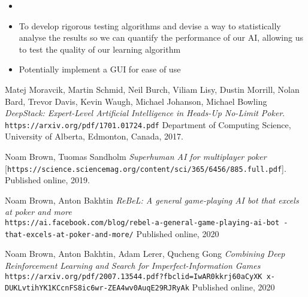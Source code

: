 \documentclass{article}
\begin{document}
\begin{multicols*}{2}
\begin{itemize}
    \item

    \item To develop rigorous testing algorithms and devise a way to statistically analyse the results so we can quantify the performance of our AI, allowing us to test the quality of our learning algorithm

    \item Potentially implement a GUI for ease of use




\end{itemize}



\end{multicols*}









\begin{thebibliography}{9}
Matej Moravcik, Martin Schmid, Neil Burch, Viliam Lisy, Dustin Morrill, Nolan Bard, Trevor Davis, Kevin Waugh, Michael Johanson, Michael Bowling
\textit{DeepStack: Expert-Level Artificial Intelligence in
Heads-Up No-Limit Poker}.
\texttt{https://arxiv.org/pdf/1701.01724.pdf}
Department of Computing Science, University of Alberta, Edmonton, Canada, 2017.

Noam Brown, Tuomas Sandholm
\textit{Superhuman AI for multiplayer poker}
[\texttt{https://science.sciencemag.org/content/sci/365/6456/885.full.pdf}].
Published online, 2019.

Noam Brown, Anton Bakhtin
\textit{ReBeL: A general game-playing AI bot that excels at poker and more}
\\\texttt{https://ai.facebook.com/blog/rebel-a-general-game-playing-ai-bot
-that-excels-at-poker-and-more/}
Published online, 2020

Noam Brown, Anton Bakhtin, Adam Lerer, Qucheng Gong
\textit{Combining Deep Reinforcement Learning and Search
for Imperfect-Information Games}
\\\texttt{https://arxiv.org/pdf/2007.13544.pdf?fbclid=IwAR0kkrj60aCyXK
x-DUKLvtihYK1KCcnFS8ic6wr-ZEA4wv0AuqE29RJRyAk}
Published online, 2020





\end{thebibliography}
\end{document}
